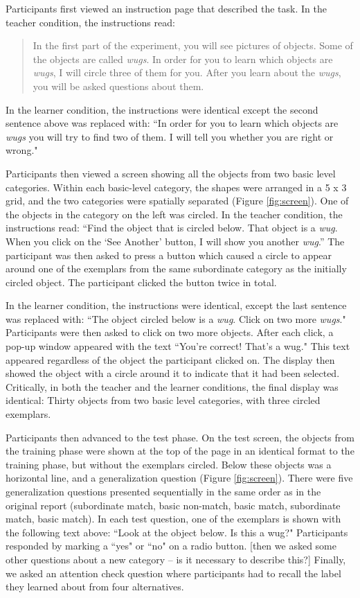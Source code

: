 \documentclass[man]{apa2}
\begin{document}
Participants first viewed an instruction page that described the task. In the teacher condition, the instructions read: 
\begin{quote}
In the first part of the experiment, you will see pictures of objects. Some of the objects are called  \textit{wugs}. In order for you to learn which objects are  \textit{wugs}, I will circle three of them for you. After you learn about the  \textit{wugs}, you will be asked questions about them.
\end{quote}
In the learner condition, the instructions were identical except the second sentence above was replaced with: ``In order for you to learn which objects are  \textit{wugs} you will try to find two of them. I will tell you whether you are right or wrong."

Participants then viewed a screen showing all the objects from two basic level categories. Within each basic-level category, the shapes were arranged in a 5 x 3 grid, and the two categories were spatially separated (Figure \ref{fig:screen}). One of the objects in the category  on the left  was circled. In the teacher condition, the instructions read: ``Find the object that is circled below. That object is a \textit{wug}. When you click on the `See Another' button, I will show you another \textit{wug}.'' The participant  was then asked to press a button which caused a circle to appear around one of the exemplars from the same subordinate category as the initially circled object. The participant clicked the button twice in total. 

In the learner condition, the instructions were identical, except the last sentence was replaced with: ``The object circled below is a \textit{wug}.  Click on two more \textit{wugs}." Participants were then asked to click on two more objects. After each click, a pop-up window appeared with the text ``You're correct! That's a wug." This text appeared regardless of the object the participant clicked on. The display then showed the object with a circle around it to indicate that it had been selected. Critically, in both the teacher and the learner conditions, the final display was identical: Thirty objects from two basic level categories, with three circled exemplars.

Participants then advanced to the test phase. On the test screen, the objects from the training phase were shown at the top of the page in an identical format to the training phase, but without the exemplars circled. Below these objects was a horizontal line, and a generalization question (Figure \ref{fig:screen}). There were five generalization questions presented sequentially in the same order as in the original report (subordinate match, basic non-match, basic match, subordinate match, basic match). In each test question, one of the exemplars is shown with the following text above: ``Look at the object below. Is this a wug?" Participants  responded by marking a ``yes" or ``no" on a radio button.  [then we asked some other questions about a new category -- is it necessary to describe this?] Finally, we asked an attention check question where participants had to recall the label they learned about from four alternatives.
\end{document}
